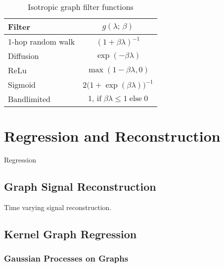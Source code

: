 \begin{table}[b]
    \renewcommand{\arraystretch}{1.7}
    \small
    \begin{center}
    \begin{tabular}{|l|c|}
    \hline
    \textbf{Filter}   & $g(\lambda; \,\beta)$    \\ 
    \hline
    1-hop random walk & $(1 + \beta \lambda)^{-1}$ \\
    \hline
    Diffusion         & $\exp(-\beta \lambda)$       \\
    \hline
    ReLu              & $\max (1 - \beta \lambda, 0)$  \\
    \hline
    Sigmoid           & $2 \big( 1 + \exp(\beta \lambda)\big)^{-1}$ \\
    \hline
    Bandlimited       & $1, \,\text{if} \; \beta \lambda \leq 1 \; \text{else} \; 0$   \\
    \hline
    \end{tabular}
    \end{center}
    \caption{Isotropic graph filter functions}
    \label{tab:iso_filters}
    \end{table}



\section{Regression and Reconstruction}

\cite{Guestrin2004} Regression


\subsection{Graph Signal Reconstruction}

\cite{Qiu2017} Time varying signal reconstruction. 

\subsection{Kernel Graph Regression}

\cite{Takeda2007}

\cite{Elias2022}

\cite{Venkitaraman2019}


\subsubsection{Gaussian Processes on Graphs}

\cite{Venkitaraman2020}

